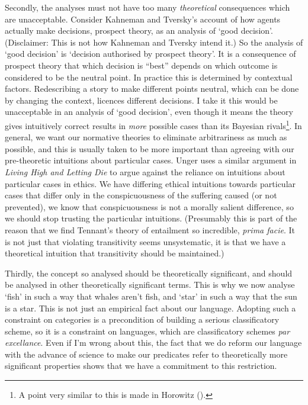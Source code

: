 \documentclass[
  10pt,
  letterpaper,
  DIV=11,
  numbers=noendperiod,
  twoside]{scrartcl}
\begin{document}
Secondly, the analyses must not have too many \emph{theoretical}
consequences which are unacceptable. Consider Kahneman and Tversky's
account of how agents actually make decisions, prospect theory, as an
analysis of `good decision'. (Disclaimer: This is not how Kahneman and
Tversky intend it.) So the analysis of `good decision' is `decision
authorised by prospect theory'. It is a consequence of prospect theory
that which decision is ``best'' depends on which outcome is considered
to be the neutral point. In practice this is determined by contextual
factors. Redescribing a story to make different points neutral, which
can be done by changing the context, licences different decisions. I
take it this would be unacceptable in an analysis of `good decision',
even though it means the theory gives intuitively correct results in
\emph{more} possible cases than its Bayesian rivals\footnote{A point
  very similar to this is made in Horowitz
  ().}. In general, we want our
normative theories to eliminate arbitrariness as much as possible, and
this is usually taken to be more important than agreeing with our
pre-theoretic intuitions about particular cases. Unger uses a similar
argument in \emph{Living High and Letting Die} to argue against the
reliance on intuitions about particular cases in ethics. We have
differing ethical intuitions towards particular cases that differ only
in the conspicuousness of the suffering caused (or not prevented), we
know that conspicuousness is not a morally salient difference, so we
should stop trusting the particular intuitions. (Presumably this is part
of the reason that we find Tennant's theory of entailment so incredible,
\emph{prima facie}. It is not just that violating transitivity seems
unsystematic, it is that we have a theoretical intuition that
transitivity should be maintained.)

Thirdly, the concept so analysed should be theoretically significant,
and should be analysed in other theoretically significant terms. This is
why we now analyse `fish' in such a way that whales aren't fish, and
`star' in such a way that the sun is a star. This is not just an
empirical fact about our language. Adopting such a constraint on
categories is a precondition of building a serious classificatory
scheme, so it is a constraint on languages, which are classificatory
schemes \emph{par excellance}. Even if I'm wrong about this, the fact
that we do reform our language with the advance of science to make our
predicates refer to theoretically more significant properties shows that
we have a commitment to this restriction.
\end{document}
